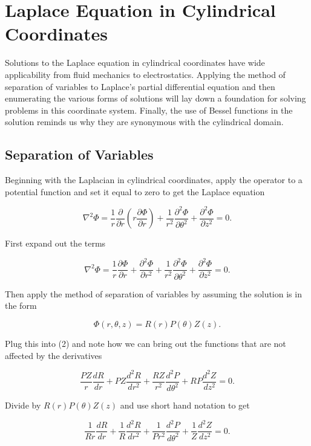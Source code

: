 \documentclass[12pt]{article}
\begin{document}
\section{Laplace Equation in Cylindrical Coordinates}

Solutions to the Laplace equation in cylindrical coordinates have wide applicability from fluid mechanics to electrostatics.
Applying the method of separation of variables to Laplace's partial differential equation and then enumerating the various forms
of solutions will lay down a foundation for solving problems in this coordinate system.  Finally, the use of Bessel functions
in the solution reminds us why they are synonymous with the cylindrical domain.

\subsection{Separation of Variables}
Beginning with the Laplacian in cylindrical coordinates, apply the operator to a potential function and set it equal to zero to get the Laplace equation

\begin{equation}
\nabla^{2} \Phi = \frac{1}{r} \frac{\partial}{\partial r}\left(r \frac{\partial\Phi}{\partial r}\right) + \frac{1}{r^2} \frac{\partial^2\Phi}{\partial \theta^2} + \frac{\partial^2 \Phi}{\partial z^2} = 0.
\end{equation}

First expand out the terms

\begin{equation}
\nabla^{2} \Phi = \frac{1}{r} \frac{\partial \Phi}{\partial r} + \frac{\partial^2\Phi}{\partial r^2} + \frac{1}{r^2} \frac{\partial^2\Phi}{\partial \theta^2} + \frac{\partial^2 \Phi}{\partial z^2} = 0.
\end{equation}

Then apply the method of separation of variables by assuming the solution is in the form

$$ \Phi \left ( r,\theta,z \right) = R(r)P(\theta)Z(z).$$

Plug this into (2) and note how we can bring out the functions that are not affected by the derivatives

$$ \frac{P Z}{r} \frac{d R}{d r} + P Z \frac{d^2 R}{d r^2} + \frac{R Z}{r^2} \frac{d^2 P}{d \theta^2}  + R P \frac{d^2 Z}{d z^2} = 0.$$

Divide by $R(r) P(\theta) Z(z)$ and use short hand notation to get

$$\frac{1}{Rr} \frac{d R}{d r} + \frac{1}{R} \frac{d^2R}{d r^2} + \frac{1}{Pr^2} \frac{d^2P}{d \theta^2} + \frac{1}{Z} \frac{d^2 Z}{dz^2} = 0.$$
\end{document}
